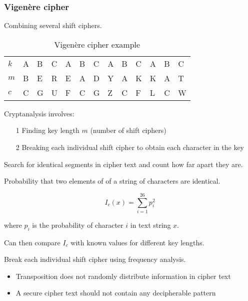 \documentclass[a4paper]{article}
\begin{document}
\subsubsection{Vigen\`ere cipher}

Combining several shift ciphers.

\begin{table}[h]
  \centering
  \begin{tabular}{@{}lllllllllllll@{}}
    \toprule
    $k$ & A & B & C & A & B & C & A & B & C & A & B & C \\
    $m$ & B & E & R & E & A & D & Y & A & K & K & A & T \\
    \midrule
    $c$ & C & G & U & F & C & G & Z & C & F & L & C & W \\
    \bottomrule
  \end{tabular}
  \caption{Vigen\`ere cipher example}
  \label{tab:vigenere_cipher_example}
\end{table}
\FloatBarrier

Cryptanalysis involves:

\begin{enumerate}
  \item[1] Finding key length $m$ (number of shift ciphers)
  \item[2] Breaking each individual shift cipher to obtain each character in the
           key
\end{enumerate}


Search for identical segments in cipher text and count how far apart they are.


Probability that two elements of of a string of characters are identical.

\[
  I_{c}(x) = \sum^{26}_{i = 1}p^{2}_{i}
\]

where $p_{i}$ is the probability of character $i$ in text string $x$.

Can then compare $I_{c}$ with known values for different key lengths.


Break each individual shift cipher using frequency analysis.


\begin{itemize}
  \item Transposition does not randomly distribute information in cipher text
  \item A secure cipher text should not contain any decipherable pattern
\end{itemize}
\end{document}
